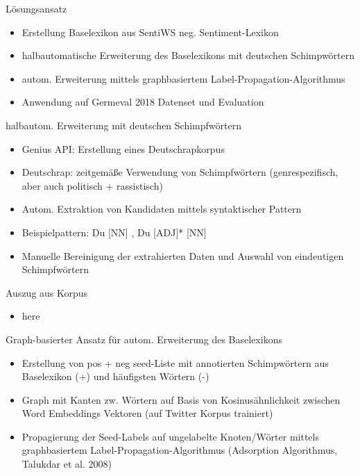 \documentclass{beamer}
\begin{document}
\begin{frame}{Lösungsansatz}
\begin{itemize}
\item Erstellung Baselexikon aus SentiWS neg. Sentiment-Lexikon
\item halbautomatische Erweiterung des Baselexikons mit deutschen Schimpwörtern
\item autom. Erweiterung mittels graphbasiertem Label-Propagation-Algorithmus
\item Anwendung auf Germeval 2018 Datenset und Evaluation
\end{itemize}
\end{frame}

\begin{frame}{halbautom. Erweiterung mit deutschen Schimpfwörtern}
\begin{itemize}
\item Genius API: Erstellung eines Deutschrapkorpus 
\item Deutschrap: zeitgemäße Verwendung von Schimpfwörtern (genrespezifisch, aber auch politisch + rassistisch)
\item Autom. Extraktion von Kandidaten mittels syntaktischer Pattern
\item Beispielpattern: Du [NN] , Du [ADJ]* [NN]
\item Manuelle Bereinigung der extrahierten Daten und Auswahl von eindeutigen Schimpfwörtern
\end{itemize}
\end{frame}

\begin{frame}{Auszug aus Korpus}
\begin{itemize}
\item here
\end{itemize}
\end{frame}


\begin{frame}{Graph-basierter Ansatz für autom. Erweiterung des Baselexikons}
\begin{itemize}
\item Erstellung von pos + neg seed-Liste mit annotierten Schimpwörtern aus Baselexikon (+) und häufigsten Wörtern (-)
\item Graph mit Kanten zw. Wörtern auf Basis von Kosinusähnlichkeit zwischen Word Embeddings Vektoren (auf Twitter Korpus trainiert)
\item Propagierung der Seed-Labels auf ungelabelte Knoten/Wörter mittels graphbasiertem Label-Propagation-Algorithmus (Adsorption Algorithmus, Talukdar et al. 2008)
\end{itemize}
\end{frame}
\end{document}

